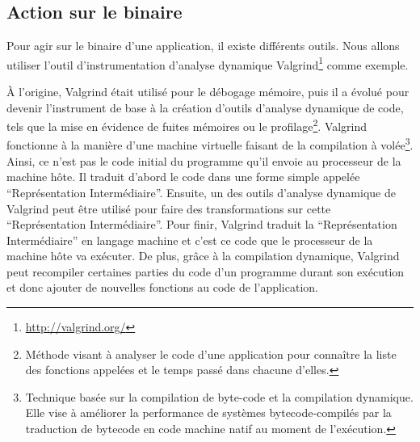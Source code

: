 \subsection{Action sur le binaire}
\label{subsubsection:valgrind}

Pour agir sur le binaire d'une application, il existe différents outils. Nous
allons utiliser l'outil d'instrumentation d'analyse dynamique Valgrind\footnote{\url{http://valgrind.org/}} \citep{Valgrind} comme exemple.

À l'origine, Valgrind était utilisé pour le débogage mémoire, puis il a évolué
pour devenir l'instrument de base à la création d'outils d'analyse dynamique de
code, tels que la mise en évidence de fuites mémoires ou le
profilage\footnote{Méthode visant à analyser le code d'une application pour
connaître la liste des fonctions appelées et le temps passé dans chacune
d'elles.}. Valgrind fonctionne à la manière d'une machine virtuelle faisant de la
compilation à volée\footnote{Technique basée sur la compilation de byte-code et
la compilation dynamique. Elle vise à améliorer la performance de systèmes
bytecode-compilés par la traduction de bytecode en code machine natif au moment
de l'exécution.}. Ainsi, ce n'est pas le code initial du programme qu'il envoie
au processeur de la machine hôte. Il traduit d'abord le code dans une forme
simple appelée ``Représentation Intermédiaire''. Ensuite, un des outils
d'analyse dynamique de Valgrind peut être utilisé pour faire des transformations
sur cette ``Représentation Intermédiaire''. Pour finir, Valgrind traduit la
``Représentation Intermédiaire'' en langage machine et c'est ce code que le
processeur de la machine hôte va exécuter. De plus, grâce à la compilation
dynamique, Valgrind peut recompiler certaines parties du code d'un programme
durant son exécution et donc ajouter de nouvelles fonctions au code de
l'application.

